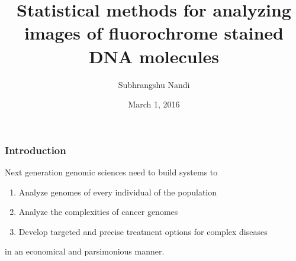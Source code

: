\documentclass[10pt,dvipsnames,table]{beamer}
\title[Statistics for Fluoroscanning]{Statistical methods for analyzing images of fluorochrome stained DNA molecules}
\author{Subhrangshu Nandi}
\institute[Prelim exam]{Preliminary Exam \\
Department of Statistics \\
University of Wisconsin-Madison}
\date{March 1, 2016}
\begin{document}
\setlength{\baselineskip}{16truept}

\frame{\maketitle}




\begin{frame}
\frametitle{Introduction}
{\Large{
Next generation genomic sciences need to build systems to
\begin{enumerate}
\item Analyze genomes of every individual of the population
\item Analyze the complexities of cancer genomes
\item Develop targeted and precise treatment options for complex diseases
\end{enumerate}
in an economical and parsimonious manner.
}}
\end{frame}
\end{document}
